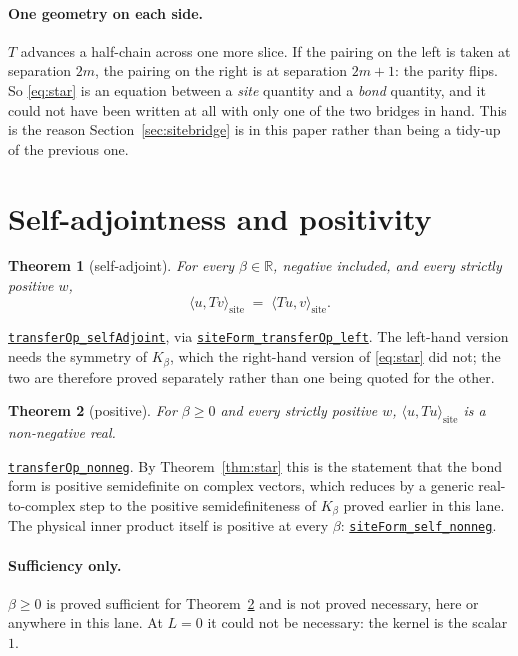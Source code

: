 \documentclass[11pt]{article}
\newtheorem{theorem}{Theorem}[section]
\theoremstyle{definition}
\newcommand{\anchor}{c90dc745ab8cd1ba7ddc02aa16fed3de339bf958}
\newcommand{\osline}[3]{%
  \href{https://github.com/lluiseriksson/THE-ERIKSSON-PROGRAMME/blob/\anchor/YangMills/OS/#1.lean\#L#2}{\nolinkurl{#3}}}
\newcommand{\R}{\mathbb{R}}
\begin{document}
\paragraph{One geometry on each side.}  $T$ advances a half-chain across one
more slice.  If the pairing on the left is taken at separation $2m$, the pairing
on the right is at separation $2m+1$: the parity flips.  So \eqref{eq:star} is
an equation between a \emph{site} quantity and a \emph{bond} quantity, and it
could not have been written at all with only one of the two bridges in hand.
This is the reason Section~\ref{sec:sitebridge} is in this paper rather than
being a tidy-up of the previous one.

\section{Self-adjointness and positivity}\label{sec:sa}

\begin{theorem}[self-adjoint]\label{thm:sa}
For every $\beta\in\R$, negative included, and every strictly positive $w$,
\[
  \langle u,Tv\rangle_{\mathrm{site}}\;=\;\langle Tu,v\rangle_{\mathrm{site}}.
\]
\end{theorem}

\osline{SpatialReconstruction}{155}{transferOp\_selfAdjoint}, via
\osline{SpatialReconstruction}{130}{siteForm\_transferOp\_left}.  The
left-hand version needs the symmetry of $K_\beta$, which the right-hand version
of \eqref{eq:star} did not; the two are therefore proved separately rather than
one being quoted for the other.

\begin{theorem}[positive]\label{thm:pos}
For $\beta\ge0$ and every strictly positive $w$, $\langle
u,Tu\rangle_{\mathrm{site}}$ is a non-negative real.
\end{theorem}

\osline{SpatialReconstruction}{208}{transferOp\_nonneg}.  By
Theorem~\ref{thm:star} this is the statement that the bond form is positive
semidefinite on complex vectors, which reduces by a generic real-to-complex step
to the positive semidefiniteness of $K_\beta$ proved earlier in this lane.  The
physical inner product itself is positive at every $\beta$:
\osline{SpatialReconstruction}{164}{siteForm\_self\_nonneg}.

\paragraph{Sufficiency only.}  $\beta\ge0$ is proved sufficient for
Theorem~\ref{thm:pos} and is not proved necessary, here or anywhere in this
lane.  At $L=0$ it could not be necessary: the kernel is the scalar $1$.
\end{document}
